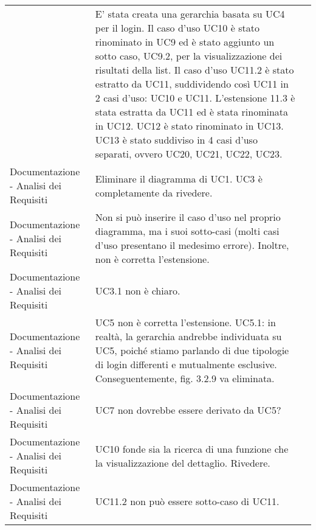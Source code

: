 \begin{longtable}{ 
				>{\centering}p{} 
				>{\centering}p{}
				>{\centering\arraybackslash}p{}}
					&
				E' stata creata una gerarchia basata su UC4 per il login.
				Il caso d'uso\ped{\textit{G}} UC10 è stato rinominato in UC9 ed è stato aggiunto un sotto caso, UC9.2, per la visualizzazione dei risultati della list.
				Il caso d'uso\ped{\textit{G}} UC11.2 è stato estratto da UC11, suddividendo così UC11 in 2 casi d'uso: UC10 e UC11.
				L’estensione 11.3 è stata estratta da UC11 ed è stata rinominata in UC12.
				UC12 è stato rinominato in UC13.
				UC13 è stato suddiviso in 4 casi d'uso\ped{\textit{G}} separati, ovvero UC20, UC21, UC22, UC23.
					\\
			
				Documentazione - Analisi dei Requisiti
					&
				Eliminare il diagramma di UC1. UC3 è completamente da rivedere.
					&

					\\
			
				Documentazione - Analisi dei Requisiti
					&
				Non si può inserire il caso d’uso nel proprio diagramma, ma i suoi sotto-casi (molti casi d’uso presentano il medesimo errore). Inoltre, non è corretta l’estensione.
					&

					\\
			
				Documentazione - Analisi dei Requisiti
					&
				UC3.1 non è chiaro.
					&

					\\
			
				Documentazione - Analisi dei Requisiti
					&
				UC5 non è corretta l’estensione. UC5.1: in realtà, la gerarchia andrebbe individuata su UC5, poiché stiamo parlando di due tipologie di login differenti e mutualmente esclusive. Conseguentemente, fig. 3.2.9 va eliminata.
					&

					\\
			
				Documentazione - Analisi dei Requisiti
					&
				UC7 non dovrebbe essere derivato da UC5?
					&
	
					\\
			
				Documentazione - Analisi dei Requisiti
					&
				UC10 fonde sia la ricerca di una funzione che la visualizzazione del dettaglio. Rivedere.
					&
	
					\\
			
				Documentazione - Analisi dei Requisiti
					&
				UC11.2 non può essere sotto-caso di UC11.
					&

					\\
			

\end{longtable}

